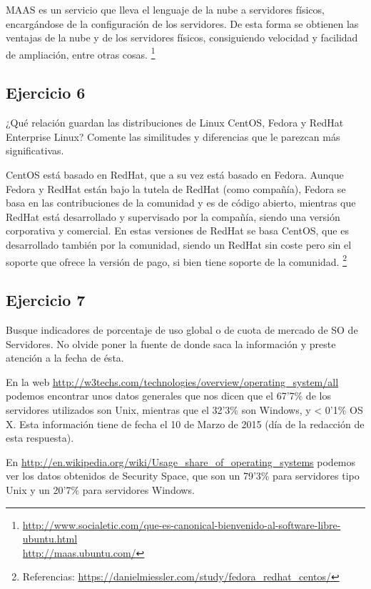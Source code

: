 \documentclass[a4paper, 11pt]{article} %
\begin{document}
MAAS es un servicio que lleva el lenguaje de la nube a servidores físicos, encargándose de la configuración de los servidores. De esta forma se obtienen las ventajas de la nube y de los servidores físicos, consiguiendo velocidad y facilidad de ampliación, entre otras cosas. 
\footnote{\url{http://www.socialetic.com/que-es-canonical-bienvenido-al-software-libre-ubuntu.html} \\ \url{http://maas.ubuntu.com/}}


\subsection*{Ejercicio 6}
¿Qué relación guardan las distribuciones de Linux CentOS, Fedora y
RedHat Enterprise Linux? Comente las similitudes y diferencias que le parezcan más
significativas.

CentOS está basado en RedHat, que a su vez está basado en Fedora. Aunque Fedora y RedHat están bajo la tutela de RedHat (como compañía), Fedora se basa en las contribuciones de la comunidad y es de código abierto, mientras que RedHat está desarrollado y supervisado por la compañía, siendo una versión corporativa y comercial. En estas versiones de RedHat se basa CentOS, que es desarrollado también por la comunidad, siendo un RedHat sin coste pero sin el soporte que ofrece la versión de pago, si bien tiene soporte de la comunidad.
\footnote{Referencias: \url{https://danielmiessler.com/study/fedora_redhat_centos/}}  


\subsection*{Ejercicio 7}
Busque indicadores de porcentaje de uso global o de cuota de mercado de
SO de Servidores. No olvide poner la fuente de donde saca la información y preste
atención a la fecha de ésta.

En la web \url{http://w3techs.com/technologies/overview/operating_system/all} podemos encontrar unos datos generales que nos dicen que el 67'7\% de los servidores utilizados son Unix, mientras que el 32'3\% son Windows, y < 0'1\% OS X. Esta información tiene de fecha el 10 de Marzo de 2015 (día de la redacción de esta respuesta). 

En \url{http://en.wikipedia.org/wiki/Usage_share_of_operating_systems} podemos ver los datos obtenidos de Security Space, que son un 79'3\% para servidores tipo Unix y un 20'7\% para servidores Windows. 
\end{document}
